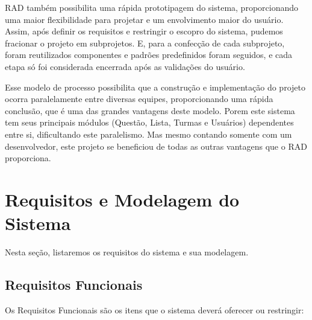 \documentclass[
	12pt,				%
	openany,
	oneside,
	a4paper,			%
	english,			%
	brazil				%
	]{abntex2}
\begin{document}
  RAD também possibilita uma rápida prototipagem do sistema, proporcionando uma maior flexibilidade para projetar e um envolvimento maior do usuário. Assim, após definir os requisitos e restringir o escopro do sistema, pudemos fracionar o projeto em subprojetos. E, para a confecção de cada subprojeto, foram reutilizados componentes e padrões predefinidos foram seguidos, e  cada etapa só foi considerada encerrada após as validações do usuário.

  Esse modelo de processo possibilita que a construção e implementação do projeto ocorra paralelamente entre diversas equipes, proporcionando uma rápida conclusão, que é uma das grandes vantagens deste modelo. Porem este sistema tem seus principais módulos (Questão, Lista, Turmas e Usuários) dependentes entre si, dificultando este paralelismo. Mas mesmo contando somente com um desenvolvedor, este projeto se beneficiou de todas as outras vantagens que o RAD proporciona.


\section{Requisitos e Modelagem do Sistema}
  Nesta seção, listaremos os requisitos do sistema e sua modelagem.

\subsection{Requisitos Funcionais}
    Os Requisitos Funcionais são os itens que o sistema deverá oferecer ou restringir:
\end{document}
